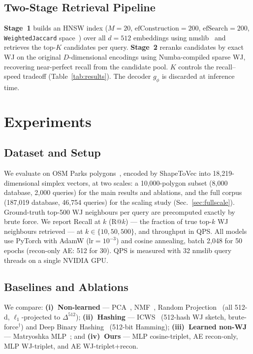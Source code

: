\documentclass[sigconf]{acmart}
\begin{document}
\subsection{Two-Stage Retrieval Pipeline}

\textbf{Stage~1} builds an HNSW index ($M=20$, $\text{efConstruction}=200$,
$\text{efSearch}=200$, \texttt{WeightedJaccard} space~\cite{shape2vec}) over all
$d=512$ embeddings using nmslib~\cite{hnsw20} and retrieves the top-$K$ candidates
per query.
\textbf{Stage~2} reranks candidates by exact WJ on the original $D$-dimensional
encodings using Numba-compiled sparse WJ, recovering near-perfect recall from
the candidate pool. $K$ controls the recall--speed tradeoff (Table~\ref{tab:results}).
The decoder $g_\phi$ is discarded at inference time.

\section{Experiments}

\subsection{Dataset and Setup}

We evaluate on OSM Parks polygons~\cite{osm,shape2vec}, encoded by ShapeToVec into
18{,}219-dimensional simplex vectors, at two scales: a 10{,}000-polygon subset
(8{,}000 database, 2{,}000 queries) for the main results and ablations, and the
full corpus (187{,}019 database, 46{,}754 queries) for the scaling study
(Sec.~\ref{sec:fullscale}). Ground-truth top-500 WJ neighbours per query are
precomputed exactly by brute force.
We report Recall at $k$ (R@$k$) --- the fraction of true top-$k$ WJ neighbours
retrieved --- at $k \in \{10, 50, 500\}$, and throughput in QPS.
All models use PyTorch with AdamW ($\text{lr}{=}10^{-3}$) and cosine annealing,
batch 2{,}048 for 50 epochs (recon-only AE: 512 for 30). QPS is measured with 32
nmslib query threads on a single NVIDIA GPU.

\subsection{Baselines and Ablations}

We compare: \textbf{(i)~Non-learned} --- PCA~\cite{jolliffe02},
NMF~\cite{nmf99}, Random Projection~\cite{achlioptas03} (all 512-d, $\ell_1$-projected
to $\Delta^{512}$); \textbf{(ii)~Hashing} --- ICWS~\cite{ioffe10} (512-hash WJ
sketch, brute-force$^\dagger$) and Deep Binary Hashing~\cite{deephashsurvey22}
(512-bit Hamming); \textbf{(iii)~Learned non-WJ} --- Matryoshka
MLP~\cite{matryoshka22}; and \textbf{(iv)~Ours} --- MLP cosine-triplet, AE
recon-only, MLP WJ-triplet, and AE WJ-triplet+recon.
\end{document}
